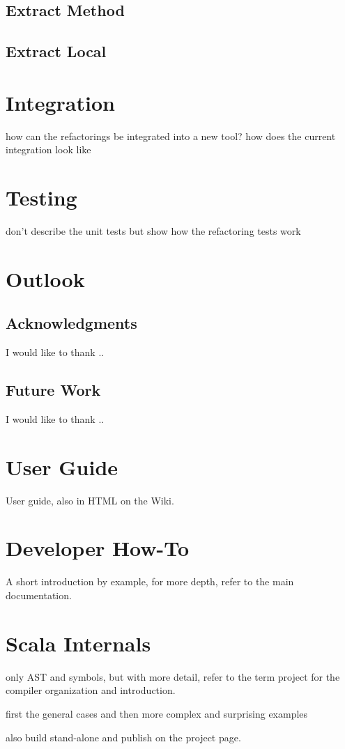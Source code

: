 \documentclass[10pt,a4paper,oneside]{scrreprt}
\begin{document}
\section{Extract Method}
\section{Extract Local}


\chapter{Integration}

how can the refactorings be integrated into a new tool?
how does the current integration look like

\chapter{Testing}

don't describe the unit tests but show how the refactoring tests work

\chapter{Outlook}

\section{Acknowledgments}

I would like to thank ..

\section{Future Work}

I would like to thank ..


\appendix

\chapter{User Guide}

User guide, also in HTML on the Wiki.

\chapter{Developer How-To}

A short introduction by example, for more depth, refer to the main documentation.

\chapter{Scala Internals}

only AST and symbols, but with more detail, refer to the term project for the compiler organization and introduction.

first the general cases and then more complex and surprising examples

also build stand-alone and publish on the project page.



\clearpage
\bib
\end{document}
